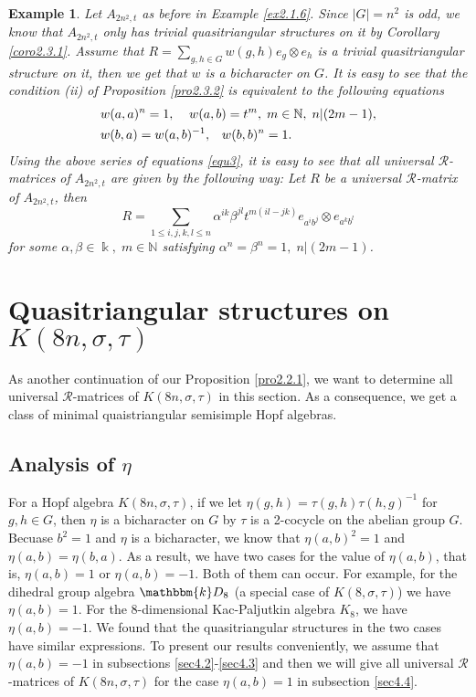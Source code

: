 \documentclass[a4paper,11pt]{amsart}
\def \k{\mathbbm{k}}
\numberwithin{equation}{section}
\newtheorem{example}[theorem]{Example}
\begin{document}
\begin{example}
\emph{Let $A_{2n^2,t}$ as before in Example \ref{ex2.1.6}. Since $|G|=n^2$ is odd, we know that $A_{2n^2,t}$ only has trivial quasitriangular structures on it by Corollary \ref{coro2.3.1}. Assume that $R=\sum_{g,h \in G}w(g,h)e_{g} \otimes e_{h}$ is a trivial quasitriangular structure on it, then we get that $w$ is a bicharacter on $G$. It is easy to see that the condition (ii) of Proposition \ref{pro2.3.2} is equivalent to the following equations
\begin{align}
&w(a,a)^n=1,\;\;\;\;
w(a,b)=t^m, \;m\in \mathbb{N},\;n|(2m-1),\label{equ3}\\
&w(b,a)=w(a,b)^{-1},\;\;\;
w(b,b)^n=1. \notag
\end{align}
Using the above series of equations \eqref{equ3}, it is easy to see that  all universal $\mathcal{R}$-matrices of $A_{2n^2,t}$ are given by the following way: Let $R$ be a universal $\mathcal{R}$-matrix of $A_{2n^2,t}$, then
$$R=\sum_{1\leq i,j,k,l \leq n}\alpha^{ik}\beta^{jl}t^{m(il-jk)}e_{a^ib^j} \otimes e_{a^kb^l}$$ for some $\alpha, \beta\in \Bbbk,\; m \in \mathbb{N}$ satisfying $\alpha^n=\beta^n=1,\; n|(2m-1) $.}
\end{example}


\section{Quasitriangular structures on $K(8n,\sigma,\tau)$}
As another continuation of our Proposition \ref{pro2.2.1}, we want to determine all universal $\mathcal{R}$-matrices of $K(8n,\sigma,\tau)$ in this section. As a consequence, we get a class of minimal quaistriangular semisimple Hopf algebras.

\subsection{Analysis of $\eta$}
For a Hopf algebra $K(8n,\sigma,\tau)$, if we let $\eta(g,h)=\tau(g,h)\tau(h,g)^{-1}$ for $g,h \in G$, then  $\eta$ is a bicharacter on $G$ by $\tau$ is a 2-cocycle on the abelian group $G$. Becuase $b^2=1$ and $\eta$ is a bicharacter, we know that $\eta(a,b)^2=1$ and $\eta(a,b)=\eta(b,a)$. As a result, we have two cases for the value of $\eta(a,b)$, that is, $\eta(a,b)=1$ or $\eta(a,b)=-1$. Both of them can occur. For example, for the dihedral group algebra $\k D_8$ (a special case of $K(8,\sigma,\tau)$) we have $\eta(a,b)=1$. For the $8$-dimensional Kac-Paljutkin algebra $K_8$, we have $\eta(a,b)=-1$. We found that the quasitriangular structures in the two cases have similar expressions. To present our results conveniently, we assume that $\eta(a,b)=-1$ in subsections \ref{sec4.2}-\ref{sec4.3} and then we will give
all universal $\mathcal{R}$-matrices of $K(8n,\sigma,\tau)$ for the case $\eta(a,b)=1$ in subsection \ref{sec4.4}.
\end{document}
